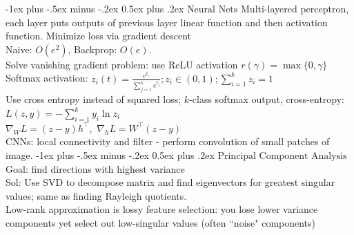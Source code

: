 \documentclass[10pt,landscape]{article}
\makeatletter
\renewcommand{\section}{\@startsection{section}{1}{0mm}%
                                {-1ex plus -.5ex minus -.2ex}%
                                {0.5ex plus .2ex}%
                                {\normalfont\large\bfseries}}
\makeatother
\begin{document}
\begin{multicols}{3}
\section{$\boxed{\text{Neural Nets}}$}
Multi-layered perceptron, each layer puts outputs of previous layer linear function and then activation function. Minimize loss via gradient descent \\
Naive: $O(e^2)$, Backprop: $O(e).$\\
Solve vanishing gradient problem: use ReLU activation $r(\gamma)=\max \{0, \gamma\}$
Softmax activation: $
z_i(t)=\frac{e^{t_i}}{\sum_{j=1}^k e^{t_j}};z_i \in(0,1) ; \sum_{i=1}^k z_i=1$\\ Use cross entropy instead of squared loss; $k$-class softmax output, cross-entropy: $L(z, y)=-\sum_{i=1}^k y_i \ln z_i$ \\ $\nabla_W L=(z-y) h^{\top},$ $
\nabla_h L =W^{\top}(z-y)
$\\
CNNs: local connectivity and filter - perform convolution of small patches of image.
\section{$\boxed{\text{Principal Component Analysis}}$}
Goal: find directions with highest variance\\
Sol: Use SVD to decompose matrix and find eigenvectors for greatest singular values; same as finding Rayleigh quotients.\\
Low-rank approximation is lossy feature selection: you lose lower variance components yet select out low-singular values (often ``noise" components)


\end{multicols}
\end{document}
